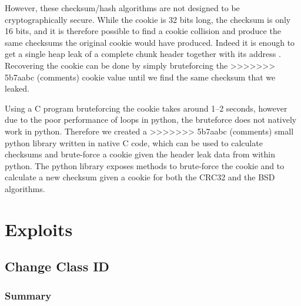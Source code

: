 \documentclass[a4paper,11pt,oneside]{report}
\begin{document}
However, these checksum/hash algorithms are not designed to be cryptographically
secure. While the cookie is 32 bits long, the checksum is only 16 bits, and it is
therefore possible to find a cookie collision and produce the same checksums the original
cookie would have produced. Indeed it is enough to get a single heap leak of a complete
chunk header together with its address . 
Recovering the cookie can be done by simply bruteforcing the
>>>>>>> 5b7aabc (comments)
cookie value until we find the same checksum that we leaked.

Using a C program bruteforcing the cookie takes around 1–2 seconds, 
however due to the poor performance of
loops in python, the bruteforce does not natively work in python. Therefore we created a
>>>>>>> 5b7aabc (comments)
small python library written in native C code, which can be used to calculate checksums
and brute-force a cookie given the header leak data from within python. The python library
exposes methods to brute-force the cookie and to calculate a new checksum given a cookie
for both the CRC32 and the BSD algorithms.


\chapter{Exploits}

\section{Change Class ID}



\subsection{Summary}
\end{document}
